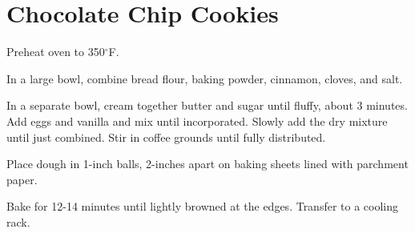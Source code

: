 \section{Chocolate Chip Cookies}
\begin{recipe}



	Preheat oven to 350$^{\circ}$F.

	In a large bowl, combine bread flour, baking powder, cinnamon, cloves, and salt.

	In a separate bowl, cream together butter and sugar until fluffy, about 3 minutes. Add eggs and vanilla and mix until incorporated. Slowly add the dry mixture until just combined. Stir in coffee grounds until fully distributed.

	Place dough in 1-inch balls, 2-inches apart on baking sheets lined with parchment paper.

	Bake for 12-14 minutes until lightly browned at the edges. Transfer to a cooling rack.
\end{recipe}
